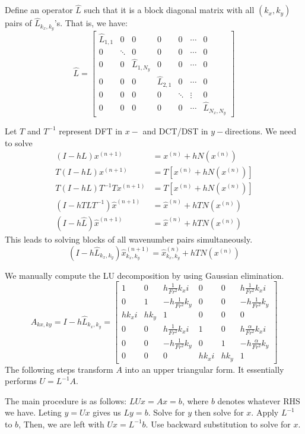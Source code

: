 \documentclass[10pt]{article}
\begin{document}
Define an operator $\hat{L}$ such that it is a block diagonal matrix with all $(k_x, k_y)$ pairs of $\hat{L}_{k_x,k_y}$'s.
That is, we have:
\[
\hat{L} = \begin{bmatrix}
\hat{L}_{1,1} & 0 & 0 & 0 & 0 & \cdots & 0 \\
0 & \ddots & 0 & 0 & 0 & \cdots& 0 \\
0 & 0 & \hat{L}_{1, N_y}  & 0 & 0 & \cdots & 0\\
0 & 0 & 0 & \hat{L}_{2,1}  & 0 & \cdots & 0\\
0 & 0 & 0 & 0 & \ddots  & \vdots& 0\\
0 & 0 & 0 & 0 & 0 & \cdots& \hat{L}_{N_x,N_y}
\end{bmatrix}\]

Let $T$ and $T^{-1}$ represent DFT in $x-$ and DCT/DST in $y-$directions.
We need to solve
\begin{align*}
(I-h L)x^{(n+1)} &= x^{(n)} + h N(x^{(n)})\\
T(I-h L)x^{(n+1)} &= T\left[x^{(n)} + h N(x^{(n)})\right]\\
T(I-h L)T^{-1}T x^{(n+1)} &= T\left[x^{(n)} + h N(x^{(n)})\right]\\
(I-h TLT^{-1})\hat{x}^{(n+1)} &= \hat{x}^{(n)} + h TN(x^{(n)})\\
(I-h \hat{L})\hat{x}^{(n+1)}  &=\hat{x}^{(n)} + h TN(x^{(n)})
\end{align*}
This leads to solving blocks of all wavenumber pairs simultaneously.
$$
(I-h \hat{L}_{k_x,k_y})\hat{x}_{k_x,k_y}^{(n+1)}  =\hat{x}_{k_x,k_y}^{(n)} + h TN(x^{(n)})
$$

We manually compute the LU decomposition by using Gaussian elimination. 
\[A_{kx, ky} = I -  h \hat{L}_{k_x, k_y}= \begin{bmatrix}
1 & 0 & h\frac{1}{Fr^2}k_xi & 0 & 0 & h\frac{1}{Fr^2}k_xi \\
0 & 1 & -h\frac{1}{Fr^2}k_y & 0 & 0 & -h\frac{1}{Fr^2}k_y\\
hk_xi & hk_y & 1 & 0 & 0 & 0 \\ 
0 & 0 & h\frac{1}{Fr^2}k_xi & 1 & 0 &  h\frac{\alpha}{Fr^2}k_xi \\
0 & 0 & -h\frac{1}{Fr^2}k_y & 0  & 1&  -h\frac{\alpha}{Fr^2}k_y \\
0 & 0 & 0 & hk_xi & hk_y & 1
\end{bmatrix}\]
The following steps transform $A$ into an upper triangular form. It essentially performs $U = L^{-1}A$.

The main procedure is as follows:
$LUx = Ax = b$, where $b$ denotes whatever RHS we have.
Leting $y = Ux$ gives us $Ly = b$. Solve for $y$ then solve for $x$.
Apply $L^{-1}$ to $b$, Then, we are left with $Ux = L^{-1}b$.
Use backward substitution to solve for $x$.
\end{document}
